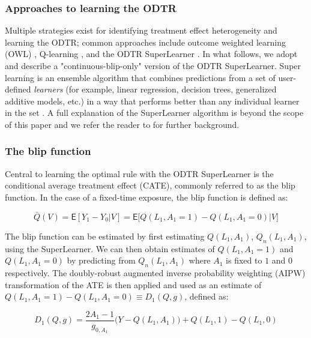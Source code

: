 \documentclass[11pt]{article}
\newcommand{\E}{\mathsf{E}}
\begin{document}
\subsubsection{Approaches to learning the ODTR}

Multiple strategies exist for identifying treatment effect heterogeneity and learning the ODTR; common approaches include outcome weighted learning (OWL) \citep{owl2012}, Q-learning \citep{murphyODTR2003,moodieQlearning2012}, and the ODTR SuperLearner \citep{luedtkeSLodtr,MontoyavanderLaanLuedtkeSkeemCoylePetersen2022}. In what follows, we adopt and describe a "continuous-blip-only" \citep{MontoyavanderLaanLuedtkeSkeemCoylePetersen2022} version of the ODTR SuperLearner. Super learning is an ensemble algorithm that combines predictions from a set of user-defined \textit{learners} (for example, linear regression, decision trees, generalized additive models, etc.) in a way that performs better than any individual learner in the set \citep{breimanStacked,van2007super}. A full explanation of the SuperLearner algorithm is beyond the scope of this paper and we refer the reader to \citet{van2007super} for further background.

\subsubsection{The blip function}

Central to learning the optimal rule with the ODTR SuperLearner is the conditional average treatment effect (CATE), commonly referred to as the blip function. In the case of a fixed-time exposure, the blip function is defined as:

\begin{equation}
  \bar{Q}(V) = \E[Y_1 - Y_0 | V] = \E\Big[Q(L_1, A_1 = 1) - Q(L_1, A_1 = 0) \Big| V\Big]  
\end{equation}

The blip function can be estimated by first estimating $Q(L_1, A_1)$, $Q_n(L_1, A_1)$, using the SuperLearner. We can then obtain estimates of $Q(L_1, A_1 = 1)$ and $Q(L_1, A_1 = 0)$ by predicting from $Q_n(L_1, A_1)$ where $A_1$ is fixed to $1$ and $0$ respectively. The doubly-robust augmented inverse probability weighting (AIPW) transformation of the ATE is then applied and used as an estimate of $Q(L_1, A_1 = 1) - Q(L_1, A_1 = 0) \equiv D_1(Q, g)$, defined as: 

\begin{equation}\label{eif1}
  D_1(Q,g) = \frac{2A_1 - 1}{g_{0, A_1}} \Big( Y - Q(L_1, A_1) \Big) + Q(L_1, 1) - Q(L_1, 0)  
\end{equation}
\end{document}
